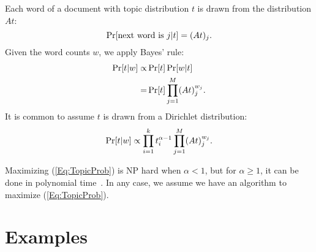 \documentclass{article}
\begin{document}
Each word of a document with topic distribution \(t\) is drawn from the distribution \(A t\):
\[ \Pr[\text{next word is \(j\)} | t] = (A t)_j \ldotp \]
Given the word counts \(w\), we apply Bayes' rule:
\begin{align*}
    \Pr[t | w] \propto & \Pr[t] \Pr[w | t]
\\  = & \Pr[t] \prod_{j=1}^M (A t)_j^{w_j} \ldotp
\end{align*}
It is common to assume \(t\) is drawn from a Dirichlet distribution:
\begin{equation}
    \label{Eq:TopicProb}
    \Pr[t | w] \propto \prod_{i = 1}^k t_i^{\alpha - 1} \prod_{j=1}^M (A t)_j^{w_j} \ldotp
\end{equation}

Maximizing (\ref{Eq:TopicProb}) is NP hard when \(\alpha < 1\), but for \(\alpha \ge 1\), it can be done in polynomial time~\cite{conf/nips/SontagR11}.
In any case, we assume we have an algorithm to maximize (\ref{Eq:TopicProb}).


\section{Examples}


{}

\end{document}
